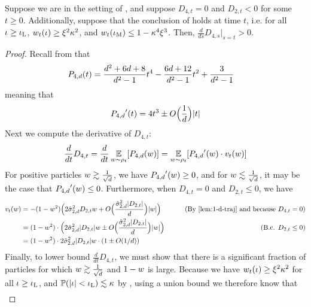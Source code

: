 \begin{lemma} \label{lemma:phase3_case2_fixedA}
Suppose we are in the setting of , and suppose $D_{4, t} = 0$ and $D_{2, t} < 0$ for some $t \geq 0$. Additionally, suppose that the conclusion of  holds at time $t$, i.e. for all $\iota \geq \iota_{\textup{L}}$, $w_t(\iota) \geq \xi^2 \kappa^2$, and $w_t(\iota_{\textup{M}}) \leq 1 - \kappa^4 \xi^3$. Then, $\frac{d}{ds} D_{4, s} \big|_{s = t} > 0$.
\end{lemma}
\begin{proof}
Recall from  that
\begin{align}
{P_{4, d}}(t)
& = \frac{d^2 + 6d + 8}{d^2 - 1} t^4 - \frac{6d + 12}{d^2 - 1} t^2 + \frac{3}{d^2 - 1}
\end{align}
meaning that
\begin{align} \label{eq:p4_derivative}
{P_{4, d}}'(t)
 = 4 t^3 \pm O\Big(\frac{1}{d}\Big) |t|
\end{align}
Next we compute the derivative of $D_{4, t}$:
\begin{align}
\frac{d}{dt} D_{4, t}
 = \frac{d}{dt} \operatorname*{\mathbb{E}}_{w \sim \rho_t}[{P_{4, d}}(w)] 
 = \operatorname*{\mathbb{E}}_{w \sim \rho_t} [{P_{4, d}}'(w) \cdot v_t(w)]
\end{align}
For positive particles $w \gtrsim \frac{1}{\sqrt{d}}$, we have ${P_{4, d}}'(w) \geq 0$, and for $w \lesssim \frac{1}{\sqrt{d}}$, it may be the case that ${P_{4, d}}'(w) \leq 0$. Furthermore, when $D_{4, t} = 0$ and $D_{2, t} \leq 0$, we have
\begin{align}
\vel_t(\w)
& = -(1 - \w^2)\Big(2 \sigmaCoeffTwo^2 D_{2, t} \w + O\Big(\frac{\sigmaCoeffTwo^2 |D_{2, t}|}{d}\Big) |\w| \Big)
& \tag{By \Cref{lem:1-d-traj} and because $D_{4, t} = 0$} \\
& = (1 - \w^2) \cdot \Big(2 \sigmaCoeffTwo^2 |D_{2, t}| \w \pm O\Big(\frac{\sigmaCoeffTwo^2 |D_{2, t}|}{d}\Big) |\w| \Big)
& \tag{B.c. $D_{2, t} \leq 0$} \\
& = (1 - \w^2) \cdot 2 \sigmaCoeffTwo^2 |D_{2, t}| \w \cdot (1 \pm O(1/d)) \label{eq:vt_bound_d4_0}
\end{align}
Finally, to lower bound $\frac{d}{dt} D_{4, t}$, we must show that there is a significant fraction of particles for which $w \gtrsim \frac{1}{\sqrt{d}}$ and $1 - w$ is large. Because we have $w_t(\iota) \geq \xi^2 \kappa^2$ for all $\iota \geq \iota_{\textup{L}}$, and $\mathbb{P}(|\iota| < \iota_{\textup{L}}) \lesssim \kappa$ by , using a union bound we therefore know that
\begin{align} \label{eq:using_invariant}

\end{align}
\end{proof}
